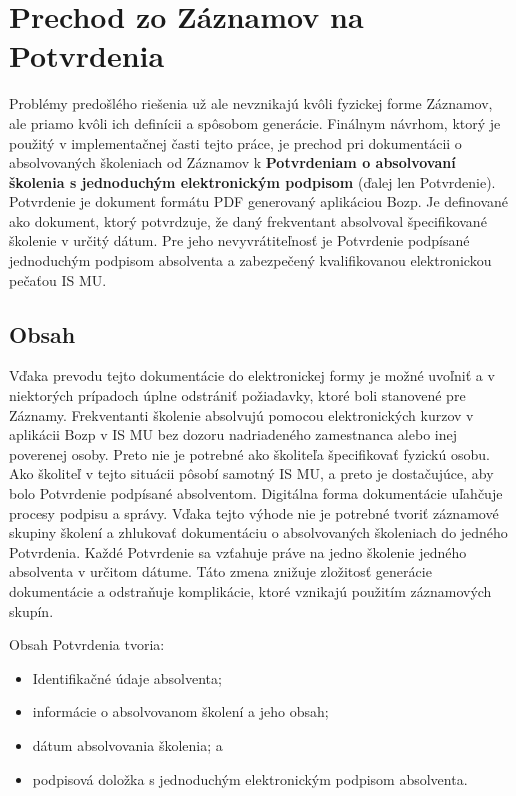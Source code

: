 \documentclass[
  digital,     %
  oneside,     %
  nosansbold,  %
  nocolorbold, %
  lof,         %
  nolot,         %
]{fithesis4}
\begin{document}
\section{Prechod zo Záznamov na Potvrdenia}
Problémy predošlého riešenia už ale nevznikajú kvôli fyzickej forme Záznamov, ale priamo kvôli ich definícii a spôsobom generácie. Finálnym návrhom, ktorý je použitý v implementačnej časti tejto práce, je prechod pri dokumentácii o absolvovaných školeniach od Záznamov k \textbf{Potvrdeniam o absolvovaní školenia s jednoduchým elektronickým podpisom} (ďalej len Potvrdenie). Potvrdenie je dokument formátu PDF generovaný aplikáciou Bozp. Je definované ako dokument, ktorý potvrdzuje, že daný frekventant absolvoval špecifikované školenie v určitý dátum. Pre jeho nevyvrátiteľnosť je Potvrdenie podpísané jednoduchým podpisom absolventa a zabezpečený kvalifikovanou elektronickou pečaťou IS MU.

\subsection*{Obsah}
Vďaka prevodu tejto dokumentácie do elektronickej formy je možné uvoľniť a v niektorých prípadoch úplne odstrániť požiadavky, ktoré boli stanovené pre Záznamy. 
Frekventanti školenie absolvujú pomocou elektronických kurzov v aplikácii Bozp v IS MU bez dozoru nadriadeného zamestnanca alebo inej poverenej osoby. Preto nie je potrebné ako školiteľa špecifikovať fyzickú osobu. Ako školiteľ v tejto situácii pôsobí samotný IS MU, a preto je dostačujúce, aby bolo Potvrdenie podpísané absolventom.
Digitálna forma dokumentácie uľahčuje procesy podpisu a správy. Vďaka tejto výhode nie je potrebné tvoriť záznamové skupiny školení a zhlukovať dokumentáciu o absolvovaných školeniach do jedného Potvrdenia. Každé Potvrdenie sa vzťahuje práve na jedno školenie jedného absolventa v určitom dátume. Táto zmena znižuje zložitosť generácie dokumentácie a odstraňuje komplikácie, ktoré vznikajú použitím záznamových skupín.

Obsah Potvrdenia tvoria:

\begin{itemize}
  \item Identifikačné údaje absolventa;
  \item informácie o absolvovanom školení a jeho obsah;
  \item dátum absolvovania školenia; a
  \item podpisová doložka s jednoduchým elektronickým podpisom absolventa.
\end{itemize}
\end{document}
